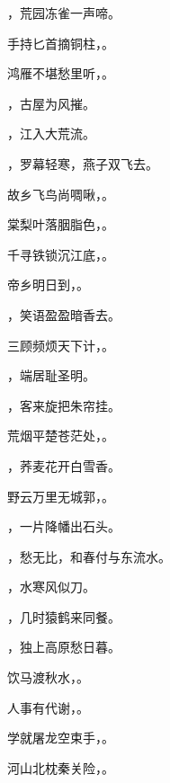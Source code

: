 \documentclass[12pt, a4paper, addpoints]{exam}
\begin{document}
\begin{questions}
\question[1] \uline{\qquad\qquad\qquad}，荒园冻雀一声啼。

\question[1] 手持匕首摘铜柱，\uline{\qquad\qquad\qquad}。

\question[1] 鸿雁不堪愁里听，\uline{\qquad\qquad\qquad}。

\question[1] \uline{\qquad\qquad\qquad}，古屋为风摧。

\question[1] \uline{\qquad\qquad\qquad}，江入大荒流。

\question[1] \uline{\qquad\qquad\qquad}，罗幕轻寒，燕子双飞去。

\question[1] 故乡飞鸟尚啁啾，\uline{\qquad\qquad\qquad}。

\question[1] 棠梨叶落胭脂色，\uline{\qquad\qquad\qquad}。

\question[1] 千寻铁锁沉江底，\uline{\qquad\qquad\qquad}。

\question[1] 帝乡明日到，\uline{\qquad\qquad\qquad}。

\question[1] \uline{\qquad\qquad\qquad}，笑语盈盈暗香去。

\question[1] 三顾频烦天下计，\uline{\qquad\qquad\qquad}。

\question[1] \uline{\qquad\qquad\qquad}，端居耻圣明。

\question[1] \uline{\qquad\qquad\qquad}，客来旋把朱帘挂。

\question[1] 荒烟平楚苍茫处，\uline{\qquad\qquad\qquad}。

\question[1] \uline{\qquad\qquad\qquad}，荞麦花开白雪香。

\question[1] 野云万里无城郭，\uline{\qquad\qquad\qquad}。

\question[1] \uline{\qquad\qquad\qquad}，一片降幡出石头。

\question[1] \uline{\qquad\qquad\qquad}，愁无比，和春付与东流水。

\question[1] \uline{\qquad\qquad\qquad}，水寒风似刀。

\question[1] \uline{\qquad\qquad\qquad}，几时猿鹤来同餐。

\question[1] \uline{\qquad\qquad\qquad}，独上高原愁日暮。

\question[1] 饮马渡秋水，\uline{\qquad\qquad\qquad}。

\question[1] 人事有代谢，\uline{\qquad\qquad\qquad}。

\question[1] 学就屠龙空束手，\uline{\qquad\qquad\qquad}。

\question[1] 河山北枕秦关险，\uline{\qquad\qquad\qquad}。


\end{questions}
\end{document}

